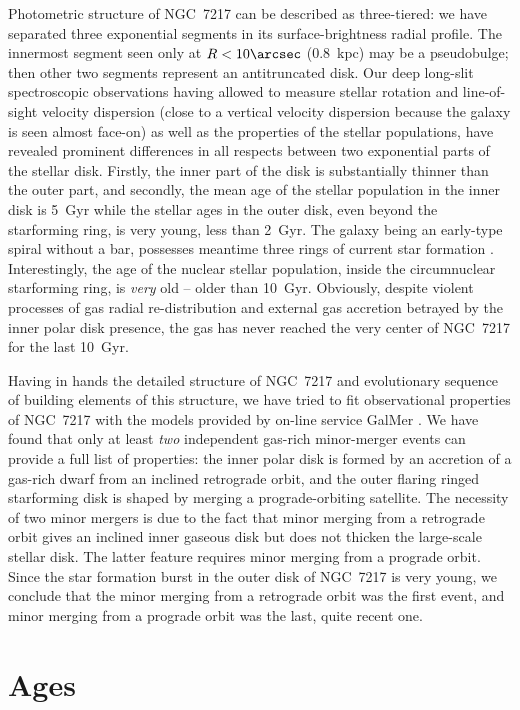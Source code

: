 \documentclass[11pt,twoside]{article}
\begin{document}
Photometric structure of NGC~7217 can be described as three-tiered: we \citep{n7217pr}
have separated three exponential segments in its surface-brightness radial profile.
The innermost segment seen only at $R<10\arcsec$ (0.8~kpc) may be a pseudobulge; then other
two segments represent an antitruncated disk. Our deep long-slit spectroscopic observations
\citep{last7217} having allowed to measure stellar rotation and line-of-sight velocity
dispersion (close to a vertical velocity dispersion because the galaxy is seen almost
face-on) as well as the properties of the stellar populations, have revealed prominent
differences in all respects between two exponential parts of the stellar disk.
Firstly, the inner part of the disk is substantially  thinner than the outer part,
and secondly, the mean age of the stellar population in the inner disk is 5~Gyr while
the stellar ages in the outer disk, even beyond the starforming ring, is very young, less
than 2~Gyr. The galaxy being an early-type spiral without a bar, possesses meantime
three rings of current star formation \citep{verdes95}. Interestingly, the age of the
nuclear stellar population, inside the circumnuclear starforming ring, is {\it very} old --
older than 10~Gyr. Obviously, despite violent processes of gas radial re-distribution
and external gas accretion betrayed by the inner polar disk presence,
the gas has never reached the very center of NGC~7217 for the last 10~Gyr.

Having in hands the detailed structure of NGC~7217 and evolutionary sequence of building elements
of this structure, we have tried to fit observational properties of NGC~7217 with the models
provided by on-line service GalMer \citep{galmer}. We have found that only at least {\it two}
independent gas-rich minor-merger events can provide a full list of properties: the inner polar
disk is formed by an accretion of a gas-rich dwarf from an inclined retrograde orbit, and
the outer flaring ringed starforming disk is shaped by merging a prograde-orbiting
satellite. The necessity of two minor mergers is due to the fact that minor merging
from a retrograde orbit gives an inclined inner gaseous disk but does not thicken the
large-scale stellar disk. The latter feature requires minor merging from a prograde orbit.
Since the star formation burst in the outer disk of NGC~7217 is very young, we conclude
that the minor merging from a retrograde orbit was the first event, and minor merging from
a prograde orbit was the last, quite recent one.

\section{Ages}
\end{document}
